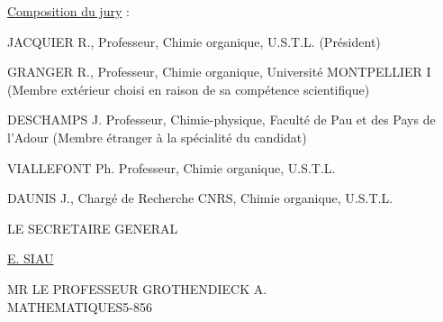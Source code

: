 \uline{Composition du jury} :

JACQUIER R., Professeur, Chimie organique, U.S.T.L. (Président)

GRANGER R., Professeur, Chimie organique, Université MONTPELLIER I (Membre extérieur choisi en raison de sa compétence scientifique)

DESCHAMPS J. Professeur, Chimie-physique, Faculté de Pau et des Pays de l'Adour (Membre étranger à la spécialité du candidat)

VIALLEFONT Ph. Professeur, Chimie organique, U.S.T.L.

DAUNIS J., Chargé de Recherche CNRS, Chimie organique, U.S.T.L.

LE SECRETAIRE GENERAL


\uline{E. SIAU}

MR LE PROFESSEUR GROTHENDIECK A.\\
MATHEMATIQUES\hfill 5-856

